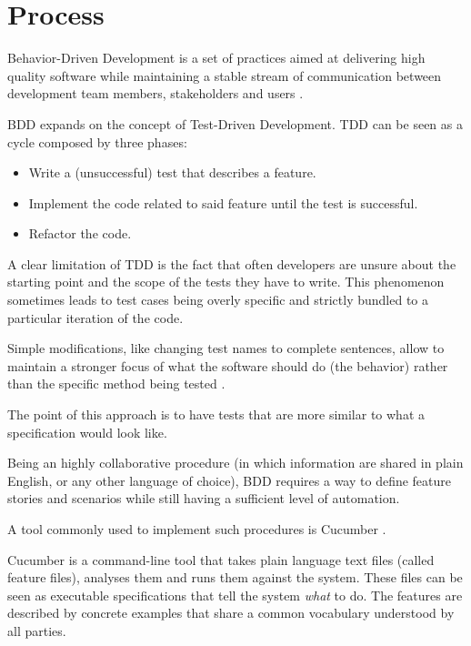 \section{Process} 

Behavior-Driven Development \cite{BDD} is a set of practices aimed at delivering high quality software while maintaining a stable stream of communication between development team members, stakeholders and users \cite[p.~12]{BDD}. 

BDD expands on the concept of Test-Driven Development. TDD can be seen as a cycle composed by three phases:

\begin{itemize}
    \item Write a (unsuccessful) test that describes a feature.
    \item Implement the code related to said feature until the test is successful.
    \item Refactor the code.
\end{itemize}

A clear limitation of TDD is the fact that often developers are unsure about the starting point and the scope of the tests they have to write. This phenomenon sometimes leads to test cases being overly specific and strictly bundled to a particular iteration of the code.

Simple modifications, like changing test names to complete sentences, allow to maintain a stronger focus of what the software should do (the behavior) rather than the specific method being tested \cite[pg.~14]{BDD}.

The point of this approach is to have tests that are more similar to what a specification would look like.

Being an highly collaborative procedure (in which information are shared in plain English, or any other language of choice), BDD requires a way to define feature stories and scenarios while still having a sufficient level of automation.

A tool commonly used to implement such procedures is Cucumber \cite{Cucumber}.

Cucumber is a command-line tool that takes plain language text files (called feature files), analyses them and runs them against the system. These files can be seen as executable specifications that tell the system \textit{what} to do. The features are described by concrete examples that share a common vocabulary understood by all parties.

